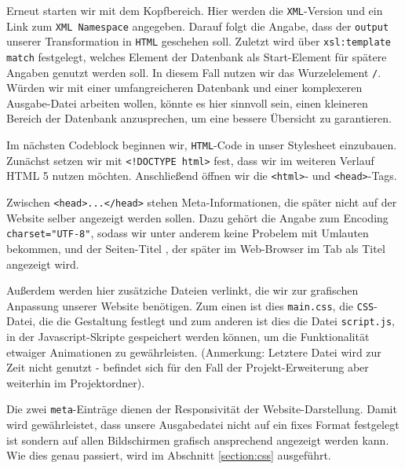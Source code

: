 Erneut starten wir mit dem Kopfbereich. Hier werden die \texttt{XML}-Version und ein Link zum \texttt{XML Namespace} angegeben. Darauf folgt die Angabe, dass der \texttt{output} unserer Transformation in \texttt{HTML} geschehen soll. Zuletzt wird über \texttt{xsl:template match} festgelegt, welches Element der Datenbank als Start-Element für spätere Angaben genutzt werden soll. In diesem Fall nutzen wir das Wurzelelement \texttt{/}. Würden wir mit einer umfangreicheren Datenbank und einer komplexeren Ausgabe-Datei arbeiten wollen, könnte es hier sinnvoll sein, einen kleineren Bereich der Datenbank anzusprechen, um eine bessere Übersicht zu garantieren.








Im nächsten Codeblock beginnen wir, \texttt{HTML}-Code in unser Stylesheet einzubauen. Zunächst setzen wir mit \texttt{<!DOCTYPE html>} fest, dass wir im weiteren Verlauf HTML 5 nutzen möchten. Anschließend öffnen wir die \texttt{<html>}- und \texttt{<head>}-Tags.

Zwischen \texttt{<head>...</head>} stehen Meta-Informationen, die später nicht auf der Website selber angezeigt werden sollen. Dazu gehört die Angabe zum Encoding \texttt{charset="UTF-8"}, sodass wir unter anderem keine Probelem mit Umlauten bekommen, und der Seiten-Titel , der später im Web-Browser im Tab als Titel angezeigt wird. 

Außerdem werden hier zusätziche Dateien verlinkt, die wir zur grafischen Anpassung unserer Website benötigen. Zum einen ist dies \texttt{main.css}, die \texttt{CSS}-Datei, die die Gestaltung festlegt und zum anderen ist dies die Datei \texttt{script.js}, in der Javascript-Skripte gespeichert werden können, um die Funktionalität etwaiger Animationen zu gewährleisten. (Anmerkung: Letztere Datei wird zur Zeit nicht genutzt - befindet sich für den Fall der Projekt-Erweiterung aber weiterhin im Projektordner).

Die zwei \texttt{meta}-Einträge dienen der Responsivität der Website-Darstellung. Damit wird gewährleistet, dass unsere Ausgabedatei nicht auf ein fixes Format festgelegt ist sondern auf allen Bildschirmen grafisch ansprechend angezeigt werden kann. Wie dies genau passiert, wird im Abschnitt \ref{section:css} ausgeführt.










